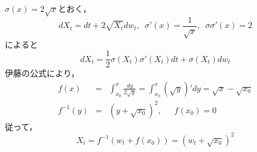 \documentclass{jsarticle}
\begin{document}
$\sigma(x)=2\sqrt{x}$とおく，
\[
dX_t = dt + 2\sqrt{X_t} dw_t,\,\,\, \sigma'(x)=\frac{1}{\sqrt{x}},\,\,\, \sigma\sigma'(x)=2
\]
によると
\[
dX_t = \frac{1}{2}\sigma(X_t)\sigma'(X_t)dt + \sigma(X_t)dw_t
\]
伊藤の公式により，
\begin{eqnarray*}
f(x) &=& \int_{x_0}^x \frac{dy}{2\sqrt{y}} = \int_{x_0}^x (\sqrt{y})'dy = \sqrt{x} - \sqrt{x_0} \\
f^{-1}(y) &=& (y + \sqrt{x_0})^2,\,\,\,\,\,\,\,\,\, f(x_0)=0
\end{eqnarray*}
従って，
\[
X_t = f^{-1}(w_t + f(x_0)) = (w_t + \sqrt{x_0})^2
\]
\end{document}
